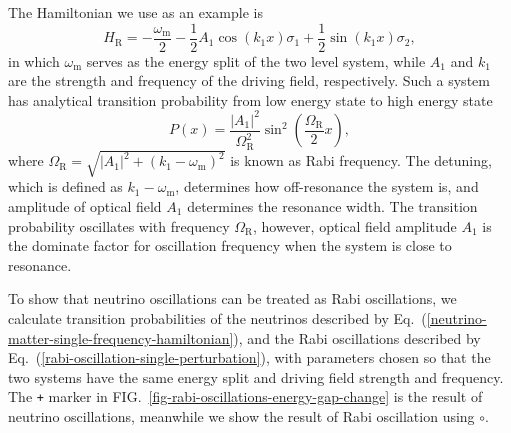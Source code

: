 \documentclass[%
preprint,
 amsmath,amssymb,
 aps,
]{revtex4-1}
\begin{document}
The Hamiltonian we use as an example is
\begin{equation}
    H_{\mathrm R} = - \frac{\omega_{\mathrm m}}{2} - \frac{1}{2}A_{1} \cos (k_1 x) \sigma_1 + \frac{1}{2} \sin (k_1 x) \sigma_2,\label{rabi-oscillation-single-perturbation}
\end{equation}
in which $\omega_{\mathrm m}$ serves as the energy split of the two level system, while $A_1$ and $k_1$ are the strength and frequency of the driving field, respectively. Such a system has analytical transition probability from low energy state to high energy state
\begin{equation}
    P(x) = \frac{\left \lvert A_1 \right \rvert ^2}{ \Omega_{\mathrm R}^2 } \sin^2 \left( \frac{\Omega_{\mathrm R}}{2} x \right),
\end{equation}
where $\Omega_{\mathrm R} = \sqrt{ \lvert A_1\rvert^2 + (k_1 - \omega_{\mathrm m})^2 }$ is known as Rabi frequency. The detuning, which is defined as $k_1 - \omega_{\mathrm m}$, determines how off-resonance the system is, and amplitude of optical field $A_1$ determines the resonance width. The transition probability oscillates with frequency $\Omega_{\mathrm R}$, however, optical field amplitude $A_1$ is the dominate factor for oscillation frequency when the system is close to resonance.






To show that neutrino oscillations can be treated as Rabi oscillations, we calculate transition probabilities of the neutrinos described by Eq.~(\ref{neutrino-matter-single-frequency-hamiltonian}), and the Rabi oscillations described by Eq.~(\ref{rabi-oscillation-single-perturbation}), with parameters chosen so that the two systems have the same energy split and driving field strength and frequency. The \verb|+| marker in FIG.~\ref{fig-rabi-oscillations-energy-gap-change} is the result of neutrino oscillations, meanwhile we show the result of Rabi oscillation using $\circ$.

\end{document}
